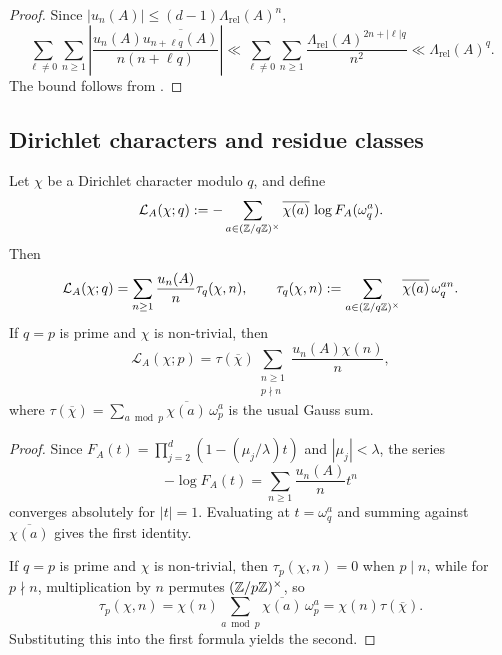\begin{proof}
  Since \(|u_n(A)|\le (d-1)\Lambda_{\mathrm{rel}}(A)^n\),
  \[
    \sum_{\ell\ne 0}\sum_{n\ge 1}
      \left|
        \frac{u_n(A)\overline{u_{n+\ell q}(A)}}{n(n+\ell q)}
      \right|
    \ll
    \sum_{\ell\ne 0}\sum_{n\ge 1}
      \frac{\Lambda_{\mathrm{rel}}(A)^{2n+|\ell|q}}{n^2}
    \ll \Lambda_{\mathrm{rel}}(A)^q.
  \]
  The bound follows from
  .
\end{proof}

\subsection{Dirichlet characters and residue classes}

\begin{proposition}
  \label{prop:finite-part-dirichlet-torsion-gauss-expansion}
  Let \(\chi\) be a Dirichlet character modulo \(q\), and define
  \[
    \mathcal L_A(\chi;q)
    :=-\sum_{a\in(\mathbb{Z}/q\mathbb{Z})^\times}
      \overline{\chi(a)}\,\log F_A(\omega_q^a).
  \]
  Then
  \[
    \mathcal L_A(\chi;q)
    =\sum_{n\ge 1}\frac{u_n(A)}{n}
      \tau_q(\chi,n),
    \qquad
    \tau_q(\chi,n)
    :=\sum_{a\in(\mathbb{Z}/q\mathbb{Z})^\times}
      \overline{\chi(a)}\,\omega_q^{an}.
  \]
  If \(q=p\) is prime and \(\chi\) is non-trivial, then
  \[
    \mathcal L_A(\chi;p)
    =\tau(\overline{\chi})
      \sum_{\substack{n\ge 1\\ p\nmid n}}
        \frac{u_n(A)\chi(n)}{n},
  \]
  where
  \(
    \tau(\overline{\chi})
    =\sum_{a\bmod p}\overline{\chi(a)}\,\omega_p^a
  \)
  is the usual Gauss sum.
\end{proposition}

\begin{proof}
  Since \(F_A(t)=\prod_{j=2}^d(1-(\mu_j/\lambda)t)\) and
  \(|\mu_j|<\lambda\), the series
  \[
    -\log F_A(t)=\sum_{n\ge 1}\frac{u_n(A)}{n}t^n
  \]
  converges absolutely for \(|t|=1\). Evaluating at \(t=\omega_q^a\) and
  summing against \(\overline{\chi(a)}\) gives the first identity.

  If \(q=p\) is prime and \(\chi\) is non-trivial, then
  \(\tau_p(\chi,n)=0\) when \(p\mid n\), while for \(p\nmid n\),
  multiplication by \(n\) permutes \((\mathbb{Z}/p\mathbb{Z})^\times\), so
  \[
    \tau_p(\chi,n)
    =\chi(n)\sum_{a\bmod p}\overline{\chi(a)}\,\omega_p^a
    =\chi(n)\tau(\overline{\chi}).
  \]
  Substituting this into the first formula yields the second.
\end{proof}

